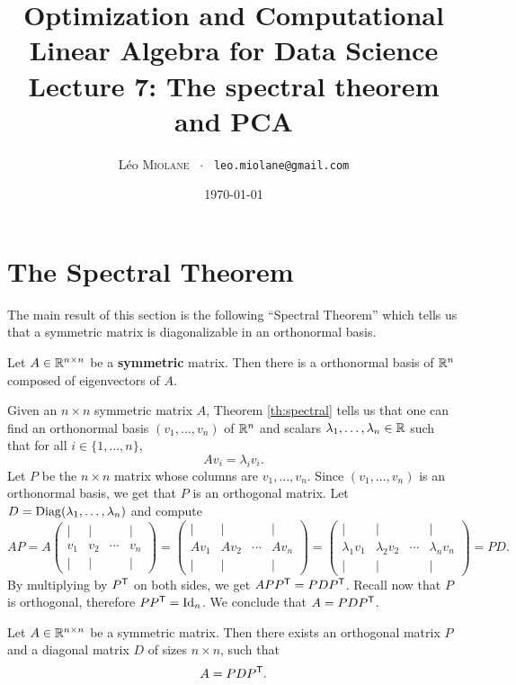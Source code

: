 \documentclass[11pt,nocut]{article}
\title{\vspace{-2.0cm}%
	Optimization and Computational Linear Algebra for Data Science\\
Lecture 7: The spectral theorem and PCA}
\author{Léo \textsc{Miolane} \ $\cdot$ \ \texttt{leo.miolane@gmail.com}}
\date{\today}
\begin{document}
\maketitle


\section{The Spectral Theorem}

The main result of this section is the following ``Spectral Theorem'' which tells us that a symmetric matrix is diagonalizable in an orthonormal basis.

\begin{theorem}\label{th:spectral}
	Let $A \in \mathbb{R}^{n \times n}$ be a \textbf{symmetric} matrix. Then there is a orthonormal basis of $\mathbb{R}^n$ composed of eigenvectors of $A$.
\end{theorem}

Given an $n \times n$ symmetric matrix $A$, Theorem \ref{th:spectral} tells us that one can find an orthonormal basis $(v_1, \dots, v_n)$ of $\mathbb{R}^n$ and scalars $\lambda_1, \dots, \lambda_n \in \mathbb{R}$ such that for all $i \in \{1, \dots, n\}$,
$$
A v_i = \lambda_i v_i.
$$
Let $P$ be the $n \times n$ matrix whose columns are $v_1, \dots, v_n$. Since $(v_1, \dots, v_n)$ is an orthonormal basis, we get that $P$ is an orthogonal matrix. Let $D = {\rm Diag}(\lambda_1, \dots, \lambda_n)$ and compute
$$
A P
= 
A 
\begin{pmatrix}
	| & | & & | \\
	v_1 & v_2 & \cdots& v_n \\
	| & | & & |
\end{pmatrix}
= 
\begin{pmatrix}
	| & | & & | \\
	Av_1 & Av_2 & \cdots& Av_n \\
	| & | & & |
\end{pmatrix}
= 
\begin{pmatrix}
	| & | & & | \\
	\lambda_1 v_1 & \lambda_2 v_2 & \cdots& \lambda_n v_n \\
	| & | & & |
\end{pmatrix}
= P D.
$$
By multiplying by $P^{{\sf T}}$ on both sides, we get $A P P^{{\sf T}} = P D P^{{\sf T}}$. Recall now that $P$ is orthogonal, therefore $P P^{{\sf T}} = {{\rm Id}}_n$. We conclude that $A = P D P^{{\sf T}}$.

\begin{theorem}\label{th:spectral2}
	Let $A \in \mathbb{R}^{n \times n}$ be a symmetric matrix. Then there exists an orthogonal matrix $P$ and a diagonal matrix $D$ of sizes $n \times n$, such that
	$$
	A = P D P^{{\sf T}}.
	$$
\end{theorem}
\end{document}
